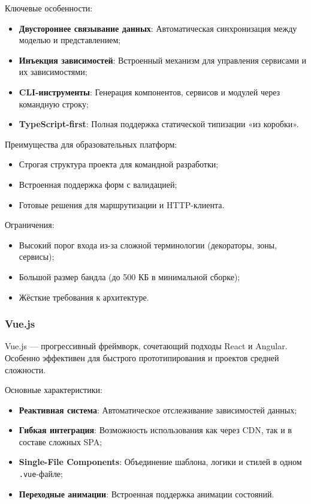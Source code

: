 Ключевые особенности:
\begin{itemize}
  \item \textbf{Двустороннее связывание данных}: Автоматическая синхронизация между моделью и представлением;
  \item \textbf{Инъекция зависимостей}: Встроенный механизм для управления сервисами и их зависимостями;
  \item \textbf{CLI-инструменты}: Генерация компонентов, сервисов и модулей через командную строку;
  \item \textbf{TypeScript-first}: Полная поддержка статической типизации «из коробки».
\end{itemize}

Преимущества для образовательных платформ:
\begin{itemize}
  \item Строгая структура проекта для командной разработки;
  \item Встроенная поддержка форм с валидацией;
  \item Готовые решения для маршрутизации и HTTP-клиента.
\end{itemize}

Ограничения:
\begin{itemize}
  \item Высокий порог входа из-за сложной терминологии (декораторы, зоны, сервисы);
  \item Большой размер бандла (до 500 КБ в минимальной сборке);
  \item Жёсткие требования к архитектуре.
\end{itemize}

\subsubsection{Vue.js}

Vue.js — прогрессивный фреймворк, сочетающий подходы React и Angular. Особенно эффективен для быстрого прототипирования и проектов средней сложности.

Основные характеристики:
\begin{itemize}
  \item \textbf{Реактивная система}: Автоматическое отслеживание зависимостей данных;
  \item \textbf{Гибкая интеграция}: Возможность использования как через CDN, так и в составе сложных SPA;
  \item \textbf{Single-File Components}: Объединение шаблона, логики и стилей в одном \texttt{.vue}-файле;
  \item \textbf{Переходные анимации}: Встроенная поддержка анимации состояний.
\end{itemize}


